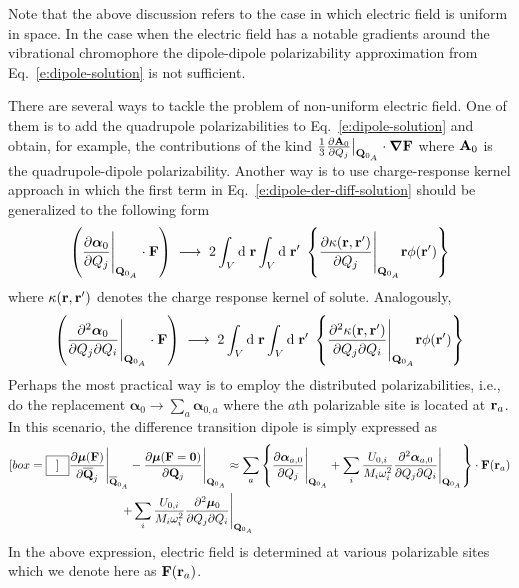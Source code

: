 \documentclass[a4paper,titlepage,twoside,fleqn,12pt]{book}
\newcommand*{\widebox}[2][0.5em]{\fbox{\hspace{#1}$\displaystyle #2$\hspace{#1}}}
\newcommand{\BM}[1]{\bm{#1}}
\begin{document}
\begin{refsection}
Note that the above discussion refers to the case
in which electric field is uniform in space. 
In the case when the electric field has a notable
gradients around the vibrational chromophore
the dipole\hyp{}dipole polarizability approximation from Eq.~\eqref{e:dipole-solution} 
is not sufficient. 

There are several ways to tackle the problem of non\hyp{}uniform
electric field.
One of them is to
add the quadrupole polarizabilities to Eq.~\eqref{e:dipole-solution} 
and obtain, for example, the contributions
of the kind $\frac{1}{3} \frac{\partial{\bf A}_0}{\partial Q_j} \big|_{{\bf Q}_{0_A}} \cdot {\BM \nabla}{\bf F}$ 
where ${\bf A}_0$ is the quadrupole-dipole polarizability. Another way is to use
charge\hyp{}response kernel approach in which
the first term in Eq.~\eqref{e:dipole-der-diff-solution} should be generalized 
to the following form\citep{Cho.JCP.2009}
%
\begin{equation} \label{e:trans-dip-cho-pot-ind-effect}
\left( \frac{\partial{\BM \alpha}_0}{\partial Q_j} \Bigg|_{{\bf Q}_{0_A}} \cdot {\bf F} \right)
\;\longrightarrow\;
2\int_V {\rm d}\;{\bf r} \int_V    {\rm d}\;{\bf r}' \; 
\left\{
\frac{\partial \kappa({\bf r},{\bf r}')}{\partial Q_j} \Bigg|_{{\bf Q}_{0_A}} {\bf r} \phi({\bf r}')
\right\}
%
\end{equation}
%
where $\kappa({\bf r},{\bf r}')$ denotes the charge response kernel
of solute. Analogously,
%
\begin{equation} \label{e:trans-dip-cho-pot-ind-effect-quadratic}
\left( \frac{\partial^2{\BM \alpha}_0}{\partial Q_j \partial Q_i} \Bigg|_{{\bf Q}_{0_A}} \cdot {\bf F} \right)
\;\longrightarrow\;
2\int_V {\rm d}\;{\bf r} \int_V    {\rm d}\;{\bf r}' \; 
\left\{
\frac{\partial^2 \kappa({\bf r},{\bf r}')}{\partial Q_j \partial Q_i} \Bigg|_{{\bf Q}_{0_A}} {\bf r} \phi({\bf r}')
\right\}
%
\end{equation}
%
Perhaps the most practical way is to employ the distributed
polarizabilities, i.e., do the replacement ${\BM \alpha}_0\rightarrow\sum_a{\BM \alpha}_{0,a}$
where the $a$th polarizable site is located at ${\bf r}_a$. 
In this scenario, the difference transition dipole 
is simply expressed as
%
\begin{multline}[box=\widebox] \label{e:dipole-der-diff-solution-distributed}
\frac{\partial{\BM \mu}({\bf F})}{\partial\overline {\bf Q}_j} \Bigg|_{\overline{\bf Q}_{0_A}} -  
 \frac{\partial{\BM \mu}({\bf F}={\bf 0})}{\partial {\bf Q}_j} \Bigg|_{{\bf Q}_{0_A}} \approx
%
\sum_a \left\{
\frac{\partial{\BM \alpha}_{a,0}}{\partial Q_j} \Bigg|_{{\bf Q}_{0_A}} 
+
\sum_i \frac{U_{0,i}}{M_i\omega_i^2} 
%
\frac{\partial^2{\BM \alpha}_{a,0}}{\partial Q_j \partial Q_i} \Bigg|_{{\bf Q}_{0_A}} 
\right\} \cdot {\bf F}({\bf r}_a) \\
+
\sum_i \frac{U_{0,i}}{M_i\omega_i^2}
\frac{\partial^2{\BM \mu}_0}{\partial Q_j \partial Q_i} \Bigg|_{{\bf Q}_{0_A}}
%
\qquad\qquad\qquad\qquad\qquad\qquad
\end{multline}
%
In the above expression, electric field is determined at
various polarizable sites which we denote here as ${\bf F}({\bf r}_a)$.


\end{refsection}
\end{document}
